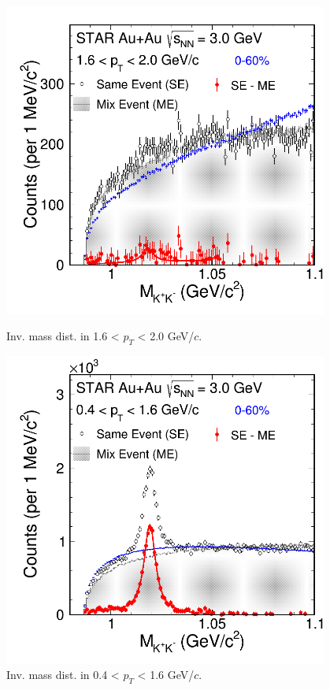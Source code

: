 \begin{figure}[htbp]
\begin{minipage}[htbp]{0.55\linewidth}
\centering
\includegraphics[width=0.95\textwidth]{chapterY/fig/fig1_signal_0_8.png}
\caption{Inv. mass dist. in 1.6 < $p_T$ < 2.0 GeV/$c$. \label{fig:mixedEvent_pT8}}
\end{minipage}
\hfill
\begin{minipage}[htbp]{0.55\linewidth}
\centering
\includegraphics[width=0.95\textwidth]{chapterY/fig/fig1_signal_0_9.png} 
\caption{Inv. mass dist. in 0.4 < $p_T$ < 1.6 GeV/$c$. \label{fig:mixedEvent_pT9}}
\end{minipage}
\end{figure}

